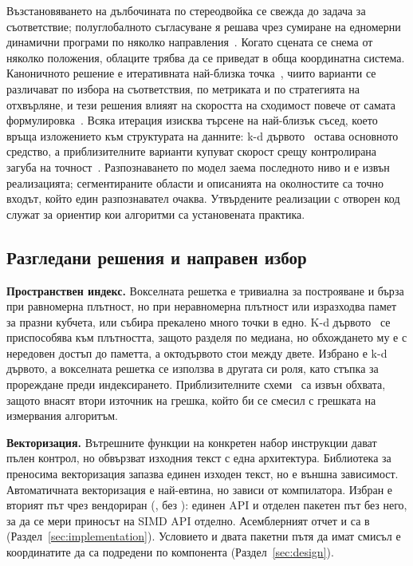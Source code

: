 Възстановяването на дълбочината по стереодвойка се свежда до задача за съответствие;
полуглобалното съгласуване я решава чрез сумиране на едномерни динамични програми по няколко
направления~\cite{hirschmuller2008sgm}. Когато сцената се снема от няколко положения, облаците
трябва да се приведат в обща координатна система. Каноничното решение е итеративната
най-близка точка~\cite{besl1992icp}, чиито варианти се различават по избора на съответствия,
по метриката и по стратегията на отхвърляне, и тези решения влияят на скоростта на сходимост
повече от самата формулировка~\cite{rusinkiewicz2001icp}. Всяка итерация изисква търсене на
най-близък съсед, което връща изложението към структурата на данните: k-d
дървото~\cite{bentley1975kdtree} остава основното средство, а приблизителните варианти купуват
скорост срещу контролирана загуба на точност~\cite{muja2014flann}. Разпознаването по модел
заема последното ниво и е извън реализацията; сегментираните области и описанията на
околностите са точно входът, който един разпознавател очаква. Утвърдените реализации с отворен
код~\cite{rusu2011pcl,bradski2000opencv} служат за ориентир кои алгоритми са установената
практика.

\subsection{Разгледани решения и направен избор}

\textbf{Пространствен индекс.} Вокселната решетка е тривиална за построяване и бърза при
равномерна плътност, но при неравномерна плътност или изразходва памет за празни кубчета,
или събира прекалено много точки в едно. K-d дървото~\cite{bentley1975kdtree} се приспособява
към плътността, защото разделя по медиана, но обхождането му е с нередовен достъп до паметта,
а октодървото стои между двете. Избрано е k-d дървото, а вокселната решетка се използва в
другата си роля, като стъпка за прореждане преди индексирането. Приблизителните
схеми~\cite{muja2014flann} са извън обхвата, защото внасят втори източник на грешка, който би
се смесил с грешката на измервания алгоритъм.

\textbf{Векторизация.} Вътрешните функции на конкретен набор инструкции дават пълен контрол,
но обвързват изходния текст с една архитектура. Библиотека за преносима векторизация запазва
единен изходен текст, но е външна зависимост. Автоматичната векторизация е най-евтина, но
зависи от компилатора. Избран е вторият път чрез вендориран 
(, без ): единен API и отделен пакетен път без
него, за да се мери приносът на SIMD API отделно. Асемблерният отчет и
 са в  (Раздел~\ref{sec:implementation}). Условието и
двата пакетни пътя да имат смисъл е координатите да са подредени по компонента
(Раздел~\ref{sec:design}).

